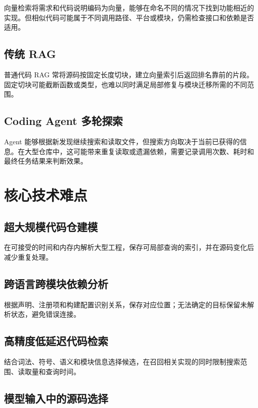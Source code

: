向量检索将需求和代码说明编码为向量，能够在命名不同的情况下找到功能相近的实现。但相似代码可能属于不同调用路径、平台或模块，仍需检查接口和依赖是否适用。

\subsection{传统 RAG}

普通代码 RAG 常将源码按固定长度切块，建立向量索引后返回排名靠前的片段。固定切块可能截断函数或类型，也难以同时满足局部修复与模块迁移所需的不同范围。

\subsection{Coding Agent 多轮探索}

Agent 能够根据新发现继续搜索和读取文件，但搜索方向取决于当前已获得的信息。在大型仓库中，这可能带来重复读取或遗漏依赖，需要记录调用次数、耗时和最终任务结果来判断效果。

\section{核心技术难点}

\subsection{超大规模代码仓建模}

在可接受的时间和内存内解析大型工程，保存可局部查询的索引，并在源码变化后减少重复处理。

\subsection{跨语言跨模块依赖分析}

根据声明、注册项和构建配置识别关系，保存对应位置；无法确定的目标保留未解析状态，避免错误连接。

\subsection{高精度低延迟代码检索}

结合词法、符号、语义和模块信息选择候选，在召回相关实现的同时限制搜索范围、读取量和查询时间。

\subsection{模型输入中的源码选择}

